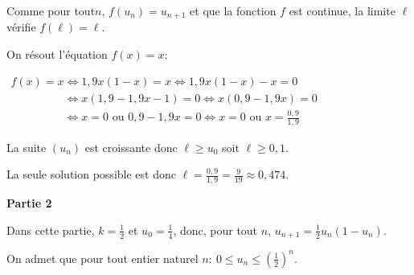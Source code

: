 \begin{enumerate}
\begin{enumerate}
Comme pour tout$n$, $f\left(u_{n}\right) = u_{n+1}$ et que la fonction $f$ est continue, la limite $\ell$ vérifie $f(\ell) = \ell$.

On résout l'équation $f(x)=x$:

$\begin{gathered}f(x)=x 
\iff 1,9x(1-x)= x
\iff 1,9x(1-x)-x =0\\
\phantom{f(x)= x}
\iff x\left (1,9 - 1,9x -1\right )=0
\iff x\left (0,9 - 1,9x\right )=0\\
\phantom{f(x)=x}
\iff x=0 \text{ ou } 0,9-1,9x=0
\iff x=0 \text{ ou } x=\frac{0,9}{1,9}\end{gathered}$

La suite $(u_n)$ est croissante donc $\ell \geqslant u_0$ soit $\ell \geqslant 0,1$.

La seule solution possible est donc $\ell = \frac{0,9}{1,9}=\frac{9}{19}\approx 0,474$.
	\end{enumerate}
\end{enumerate}

\bigskip

\textbf{Partie 2}

\medskip

 Dans cette partie, $k= \frac12$  et $u_0 = \frac14$, donc, pour tout $n$,\: $u_{n+1} = \frac12 u_n \left(1 - u_n\right)$.

On admet que pour tout entier naturel $n :\: 0 \leqslant u_n \leqslant \left(\frac12\right)^n$.



